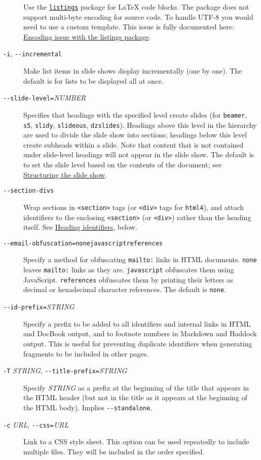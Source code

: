 \documentclass[]{article}
\begin{document}
\begin{description}
Use the \href{https://ctan.org/pkg/listings}{\texttt{listings}} package
for LaTeX code blocks. The package does not support multi-byte encoding
for source code. To handle UTF-8 you would need to use a custom
template. This issue is fully documented here:
\href{https://en.wikibooks.org/wiki/LaTeX/Source_Code_Listings\#Encoding_issue}{Encoding
issue with the listings package}.
\item[\texttt{-i}, \texttt{-\/-incremental}]
Make list items in slide shows display incrementally (one by one). The
default is for lists to be displayed all at once.
\item[\texttt{-\/-slide-level=}\emph{NUMBER}]
Specifies that headings with the specified level create slides (for
\texttt{beamer}, \texttt{s5}, \texttt{slidy}, \texttt{slideous},
\texttt{dzslides}). Headings above this level in the hierarchy are used
to divide the slide show into sections; headings below this level create
subheads within a slide. Note that content that is not contained under
slide-level headings will not appear in the slide show. The default is
to set the slide level based on the contents of the document; see
\protect\hyperlink{structuring-the-slide-show}{Structuring the slide
show}.
\item[\texttt{-\/-section-divs}]
Wrap sections in \texttt{\textless{}section\textgreater{}} tags (or
\texttt{\textless{}div\textgreater{}} tags for \texttt{html4}), and
attach identifiers to the enclosing
\texttt{\textless{}section\textgreater{}} (or
\texttt{\textless{}div\textgreater{}}) rather than the heading itself.
See \protect\hyperlink{heading-identifiers}{Heading identifiers}, below.
\item[\texttt{-\/-email-obfuscation=none}\textbar{}\texttt{javascript}\textbar{}\texttt{references}]
Specify a method for obfuscating \texttt{mailto:} links in HTML
documents. \texttt{none} leaves \texttt{mailto:} links as they are.
\texttt{javascript} obfuscates them using JavaScript.
\texttt{references} obfuscates them by printing their letters as decimal
or hexadecimal character references. The default is \texttt{none}.
\item[\texttt{-\/-id-prefix=}\emph{STRING}]
Specify a prefix to be added to all identifiers and internal links in
HTML and DocBook output, and to footnote numbers in Markdown and Haddock
output. This is useful for preventing duplicate identifiers when
generating fragments to be included in other pages.
\item[\texttt{-T} \emph{STRING},
\texttt{-\/-title-prefix=}\emph{STRING}]
Specify \emph{STRING} as a prefix at the beginning of the title that
appears in the HTML header (but not in the title as it appears at the
beginning of the HTML body). Implies \texttt{-\/-standalone}.
\item[\texttt{-c} \emph{URL}, \texttt{-\/-css=}\emph{URL}]
Link to a CSS style sheet. This option can be used repeatedly to include
multiple files. They will be included in the order specified.


\end{description}
\end{document}
